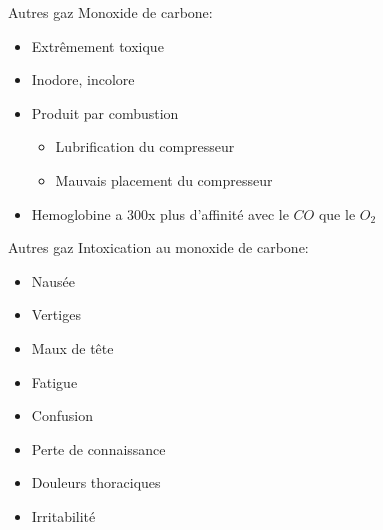 	\begin{frame}{Autres gaz}  
		Monoxide de carbone:
		\begin{itemize}
			\item Extrêmement toxique
			\item Inodore, incolore
			\item Produit par combustion
			\begin{itemize}
				\item Lubrification du compresseur
				\item Mauvais placement du compresseur
			\end{itemize}
			\item Hemoglobine a 300x plus d'affinité avec le $CO$ que le $O_2$
		\end{itemize}
	\end{frame}

	\begin{frame}{Autres gaz}  
		Intoxication au monoxide de carbone:
		\begin{itemize}
			\item Nausée
			\item Vertiges
			\item Maux de tête
			\item Fatigue
			\item Confusion
			\item Perte de connaissance
			\item Douleurs thoraciques
			\item Irritabilité
		\end{itemize}
	\end{frame}